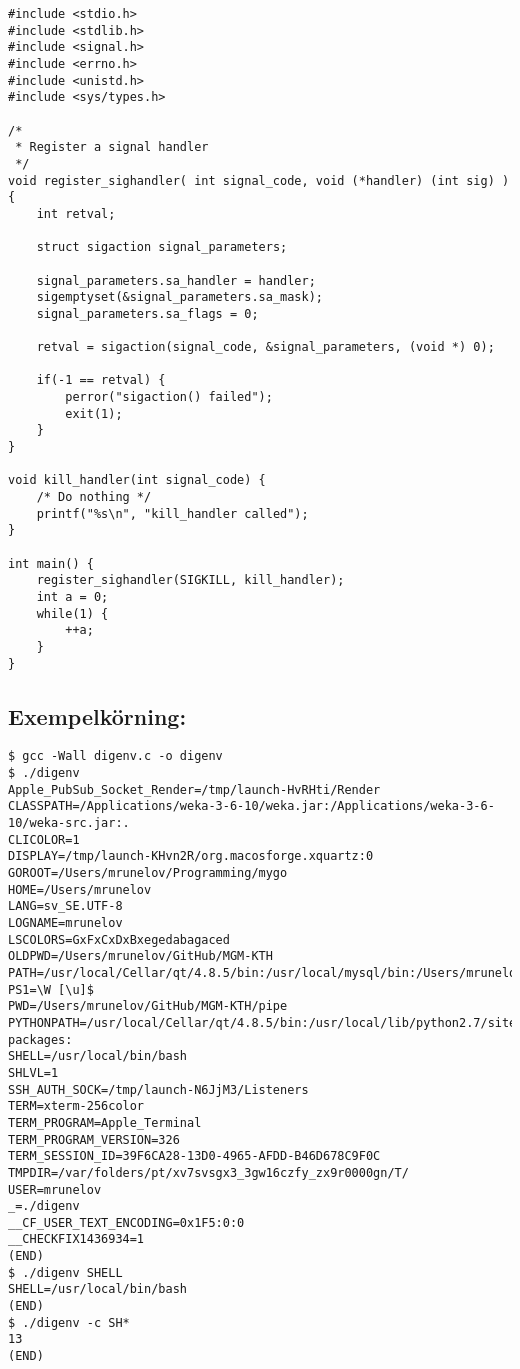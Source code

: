 \documentclass[paper=a4, fontsize=11pt]{scrartcl} %
\numberwithin{equation}{section} %
\numberwithin{figure}{section} %
\numberwithin{table}{section} %
\begin{document}
\begin{verbatim}
#include <stdio.h>
#include <stdlib.h>
#include <signal.h>
#include <errno.h>
#include <unistd.h>
#include <sys/types.h>

/*
 * Register a signal handler
 */
void register_sighandler( int signal_code, void (*handler) (int sig) )  {
    int retval;

    struct sigaction signal_parameters;

    signal_parameters.sa_handler = handler;
    sigemptyset(&signal_parameters.sa_mask);
    signal_parameters.sa_flags = 0;

    retval = sigaction(signal_code, &signal_parameters, (void *) 0);

    if(-1 == retval) {
        perror("sigaction() failed");
        exit(1);
    }
}

void kill_handler(int signal_code) {
    /* Do nothing */
    printf("%s\n", "kill_handler called");
}

int main() {
    register_sighandler(SIGKILL, kill_handler);
    int a = 0;
    while(1) {
        ++a;
    }
}
\end{verbatim}
\newpage


\subsection*{Exempelkörning:}

\begin{verbatim}
$ gcc -Wall digenv.c -o digenv
$ ./digenv 
Apple_PubSub_Socket_Render=/tmp/launch-HvRHti/Render
CLASSPATH=/Applications/weka-3-6-10/weka.jar:/Applications/weka-3-6-10/weka-src.jar:.
CLICOLOR=1
DISPLAY=/tmp/launch-KHvn2R/org.macosforge.xquartz:0
GOROOT=/Users/mrunelov/Programming/mygo
HOME=/Users/mrunelov
LANG=sv_SE.UTF-8
LOGNAME=mrunelov
LSCOLORS=GxFxCxDxBxegedabagaced
OLDPWD=/Users/mrunelov/GitHub/MGM-KTH
PATH=/usr/local/Cellar/qt/4.8.5/bin:/usr/local/mysql/bin:/Users/mrunelov/scripts:/opt/local/bin:/opt/local/sbin:/usr/local/bin:/usr/local/google_appengine:/usr/local:/Library/Frameworks/Python.framework/Versions/2.7/bin:/usr/local/bin:/usr/bin:/bin:/usr/sbin:/sbin:/opt/X11/bin:/usr/local/go/bin:/usr/texbin:/Users/mrunelov/Programming/mygo/bin:/usr/local/go/bin
PS1=\W [\u]$ 
PWD=/Users/mrunelov/GitHub/MGM-KTH/pipe
PYTHONPATH=/usr/local/Cellar/qt/4.8.5/bin:/usr/local/lib/python2.7/site-packages:
SHELL=/usr/local/bin/bash
SHLVL=1
SSH_AUTH_SOCK=/tmp/launch-N6JjM3/Listeners
TERM=xterm-256color
TERM_PROGRAM=Apple_Terminal
TERM_PROGRAM_VERSION=326
TERM_SESSION_ID=39F6CA28-13D0-4965-AFDD-B46D678C9F0C
TMPDIR=/var/folders/pt/xv7svsgx3_3gw16czfy_zx9r0000gn/T/
USER=mrunelov
_=./digenv
__CF_USER_TEXT_ENCODING=0x1F5:0:0
__CHECKFIX1436934=1
(END) 
$ ./digenv SHELL
SHELL=/usr/local/bin/bash
(END) 
$ ./digenv -c SH*
13
(END)
\end{verbatim}

\end{document}
